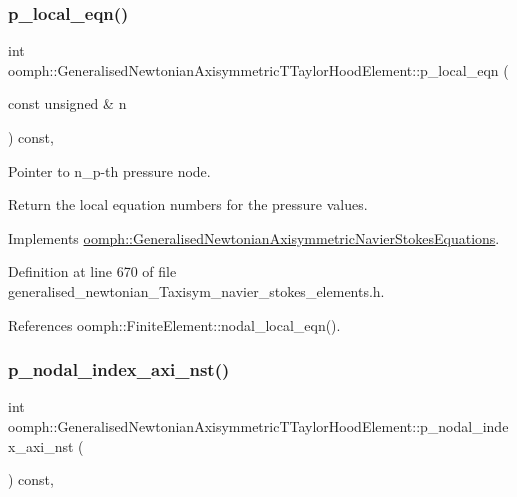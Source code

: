 \subsubsection{\texorpdfstring{p\+\_\+local\+\_\+eqn()}{p\_local\_eqn()}}
{\footnotesize\ttfamily int oomph\+::\+Generalised\+Newtonian\+Axisymmetric\+T\+Taylor\+Hood\+Element\+::p\+\_\+local\+\_\+eqn (\begin{DoxyParamCaption}\item[{const unsigned \&}]{n }\end{DoxyParamCaption}) const\hspace{0.3cm}{\ttfamily [inline]}, {\ttfamily [virtual]}}



Pointer to n\+\_\+p-\/th pressure node. 

Return the local equation numbers for the pressure values. 

Implements \hyperlink{classoomph_1_1GeneralisedNewtonianAxisymmetricNavierStokesEquations_a1432210bfed0cd920d1fb1c4d9e73d3f}{oomph\+::\+Generalised\+Newtonian\+Axisymmetric\+Navier\+Stokes\+Equations}.



Definition at line 670 of file generalised\+\_\+newtonian\+\_\+\+Taxisym\+\_\+navier\+\_\+stokes\+\_\+elements.\+h.



References oomph\+::\+Finite\+Element\+::nodal\+\_\+local\+\_\+eqn().

\mbox{\label{classoomph_1_1GeneralisedNewtonianAxisymmetricTTaylorHoodElement_a5be1c1c8da5bffcaeedb416349df36d7}} 
\subsubsection{\texorpdfstring{p\+\_\+nodal\+\_\+index\+\_\+axi\+\_\+nst()}{p\_nodal\_index\_axi\_nst()}}
{\footnotesize\ttfamily int oomph\+::\+Generalised\+Newtonian\+Axisymmetric\+T\+Taylor\+Hood\+Element\+::p\+\_\+nodal\+\_\+index\+\_\+axi\+\_\+nst (\begin{DoxyParamCaption}{ }\end{DoxyParamCaption}) const\hspace{0.3cm}{\ttfamily [inline]}, {\ttfamily [virtual]}}



